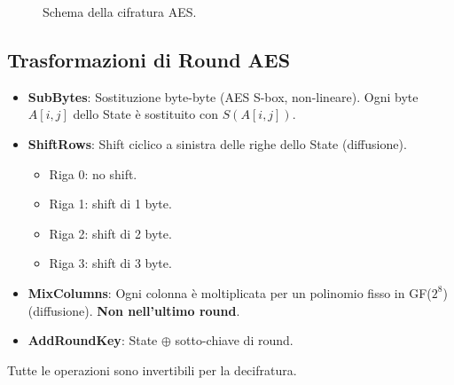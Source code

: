 \begin{figure}[H]
    \caption{Schema della cifratura AES.}
    \end{figure}

\subsection{Trasformazioni di Round AES}
\begin{itemize}
    \item \textbf{SubBytes}: Sostituzione byte-byte (AES S-box, non-lineare).
    Ogni byte $A[i,j]$ dello State è sostituito con $S(A[i,j])$.
    \item \textbf{ShiftRows}: Shift ciclico a sinistra delle righe dello State (diffusione).
    \begin{itemize}
        \item Riga 0: no shift.
        \item Riga 1: shift di 1 byte.
        \item Riga 2: shift di 2 byte.
        \item Riga 3: shift di 3 byte.
    \end{itemize}
    \item \textbf{MixColumns}: Ogni colonna è moltiplicata per un polinomio fisso in GF($2^8$) (diffusione). \textbf{Non nell'ultimo round}.
    \item \textbf{AddRoundKey}: State $\oplus$ sotto-chiave di round.
\end{itemize}
Tutte le operazioni sono invertibili per la decifratura.

